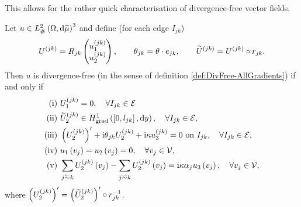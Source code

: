 This allows for the rather quick characterisation of divergence-free vector fields.
\begin{prop}
	Let $u\in L^2_{\#}\left( \Omega,\mathrm{d} \widetilde{\mu} \right)^3$ and define (for each edge $I_{jk}$)
	\begin{align*}
		U^{(jk)} = R_{jk}\begin{pmatrix} u_1^{(jk)} \\ u_2^{(jk)} \end{pmatrix}, 
		\qquad \theta_{jk} = \theta\cdot e_{jk}, 
		\qquad \widetilde{U}^{(jk)} = U^{(jk)}\circ r_{jk}.
	\end{align*}		
	Then $u$ is divergence-free (in the sense of definition \ref{def:DivFree-AllGradients}) if and only if
	\begin{align*}
		\mathrm{(i)} \ & U_1^{(jk)} = 0, \quad \forall I_{jk}\in\edgeSet \\
		\mathrm{(ii)} \ & \widetilde{U}_2^{(jk)}\in\gradSob{\sqbracs{0,l_{jk}}}{y}, \quad \forall I_{jk}\in\edgeSet, \\
		\mathrm{(iii)} \ & \bracs{U_2^{(jk)}}' + \rmi\qm_{jk}U_2^{(jk)} + \rmi\wavenumber u_3^{(jk)} = 0 \text{ on } I_{jk}, \quad \forall I_{jk}\in\edgeSet, \\
		\mathrm{(iv)} \ & u_1\bracs{v_j} = u_2\bracs{v_j} = 0, \quad \forall v_j\in\vertSet, \\
		\mathrm{(v)} \ & \sum_{j\conRight k}U_2^{(jk)}\bracs{v_j} - \sum_{j\conLeft k}U_2^{(jk)}\bracs{v_j} = \rmi\wavenumber\alpha_j u_3\bracs{v_j}, \quad \forall v_j\in\vertSet,
	\end{align*}
	where $\left( U_2^{(jk)} \right)' = \left( \widetilde{U}_2^{(jk)} \right)'\circ r_{jk}^{-1}$.
\end{prop}
